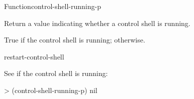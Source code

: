 \documentclass[10pt,twoside,english,pdftex]{article}
\begin{document}
\begin{functiondoc}{Function}{control-shell-running-p}{\noargs{}
    \returns{} }

\fnsyntax

\fnpurpose Return a value indicating whether a control shell is running.

\fnpackage {}

\fnmodule {}

\fnreturns True if the control shell is running; \nil{} otherwise.

\begin{alsos}{restart-control-shell}
\end{alsos}

\fnexample
See if the control shell is running:
%
\W\supp
\begin{example}
> (control-shell-running-p)
nil
\end{example}

\end{functiondoc}

\end{document}
